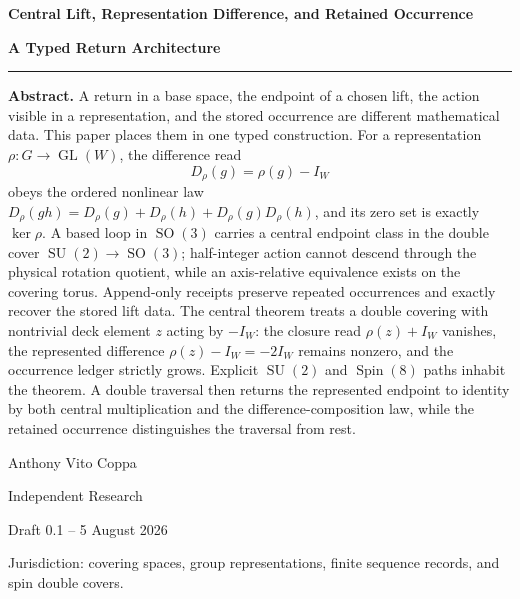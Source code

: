 \documentclass[11pt,letterpaper]{article}
\theoremstyle{returnstyle}
\newcommand{\GL}{\operatorname{GL}}
\newcommand{\SO}{\operatorname{SO}}
\newcommand{\SU}{\operatorname{SU}}
\newcommand{\Spin}{\operatorname{Spin}}
\begin{document}
\hypersetup{pageanchor=false}

\begin{titlepage}
\thispagestyle{empty}
\vspace*{0.09\textheight}

{\fontsize{28}{33}\selectfont\bfseries\color{onyx} Central Lift, Representation Difference, and Retained Occurrence\par}
\vspace{0.75em}
{\fontsize{17}{22}\selectfont\bfseries A Typed Return Architecture\par}

\vspace{2.0em}
\color{gold}\rule{0.62\textwidth}{1.1pt}\color{black}
\vspace{1.9em}

\begin{abstractbox}
\textbf{Abstract.}
A return in a base space, the endpoint of a chosen lift, the action visible in a representation, and the stored occurrence are different mathematical data.  This paper places them in one typed construction.  For a representation $\rho:G\to\GL(W)$, the difference read
\[
D_\rho(g)=\rho(g)-I_W
\]
obeys the ordered nonlinear law $D_\rho(gh)=D_\rho(g)+D_\rho(h)+D_\rho(g)D_\rho(h)$, and its zero set is exactly $\ker\rho$.  A based loop in $\SO(3)$ carries a central endpoint class in the double cover $\SU(2)\to\SO(3)$; half-integer action cannot descend through the physical rotation quotient, while an axis-relative equivalence exists on the covering torus.  Append-only receipts preserve repeated occurrences and exactly recover the stored lift data.  The central theorem treats a double covering with nontrivial deck element $z$ acting by $-I_W$: the closure read $\rho(z)+I_W$ vanishes, the represented difference $\rho(z)-I_W=-2I_W$ remains nonzero, and the occurrence ledger strictly grows.  Explicit $\SU(2)$ and $\Spin(8)$ paths inhabit the theorem.  A double traversal then returns the represented endpoint to identity by both central multiplication and the difference-composition law, while the retained occurrence distinguishes the traversal from rest.
\end{abstractbox}

\vfill
{\large Anthony Vito Coppa\par}
{\large Independent Research\par}
{\large Draft 0.1 -- 5 August 2026\par}
\vspace{0.6em}
{\small Jurisdiction: covering spaces, group representations, finite sequence records, and spin double covers.\par}
\end{titlepage}
\hypersetup{pageanchor=true}
\end{document}

